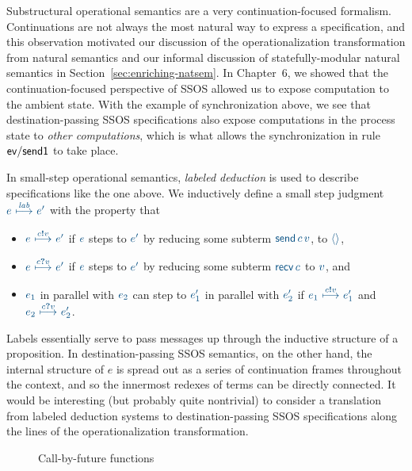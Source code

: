 Substructural  operational semantics  are a  very continuation-focused
formalism.  Continuations  are not  always  the  most  natural way  to
express a specification, and this observation motivated our discussion
of  the operationalization transformation  from natural  semantics and
our  informal discussion  of statefully-modular  natural  semantics in
Section~\ref{sec:enriching-natsem}.  In Chapter~6,  we showed that the
continuation-focused  perspective   of  SSOS  allowed   us  to  expose
computation to the ambient  state. With the example of synchronization
above, we see that destination-passing SSOS specifications also expose
computations in  the process state to {\it  other computations}, which
is what  allows the synchronization  in rule ${\sf ev/send1}$  to take
place.

In small-step operational
semantics, {\it labeled deduction} is used to describe specifications like
the one above. We inductively define a small step judgment 
$\obj{e ~{\stackrel{\footnotesize{\it lab}}{\longmapsto}}~
e'}$ with the property that
\smallskip
\begin{itemize}
\item $\obj{e ~{\stackrel{\footnotesize{c{\textbf{!}}v}}{\longmapsto}}~
e'}$ if $\obj{e}$ steps to $\obj{e'}$ by reducing some subterm 
$\obj{{\sf send}\,c\,v}$,
to $\obj{\langle\rangle}$,
\item $\obj{e
~{\stackrel{\footnotesize{c{\textbf{?}}v}}{\longmapsto}}~ e'}$ if $\obj{e}$
steps to $\obj{e'}$ by reducing some subterm $\obj{{\sf recv}\,c}$ to 
$\obj{v}$, and 
\item $\obj{e_1}$ in parallel with $\obj{e_2}$ can step to $\obj{e_1'}$
in parallel with $\obj{e_2'}$ if $\obj{e_1
~{\stackrel{\footnotesize{c{\textbf{!}}v}}{\longmapsto}}~ e_1'}$ and
$\obj{e_2 ~{\stackrel{\footnotesize{c{\textbf{?}}v}}{\longmapsto}}~ e_2'}$.
\end{itemize}
\smallskip
Labels essentially serve to pass messages up through the inductive
structure of a proposition.  In destination-passing SSOS semantics, on
the other hand, the internal structure of $e$ is spread out as a
series of continuation frames throughout the context, and so the
innermost redexes of terms can be directly connected. It would be
interesting (but probably quite nontrivial) to consider a translation
from labeled deduction systems to destination-passing SSOS
specifications along the lines of the operationalization
transformation.


\begin{figure}
\caption{Call-by-future functions}
\label{fig:dest-futures}
\end{figure}

